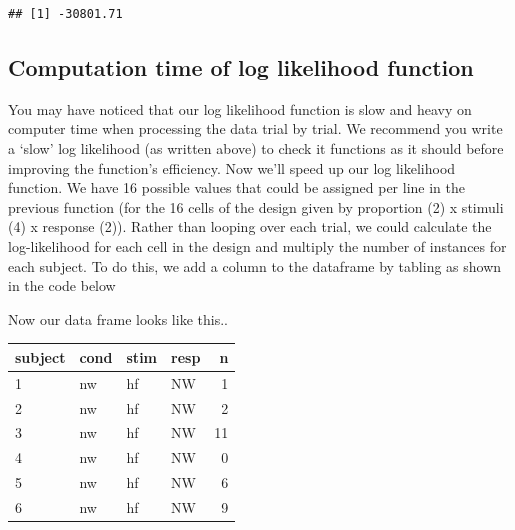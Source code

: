 \documentclass[]{book}
\newenvironment{Shaded}{\begin{snugshade}}{\end{snugshade}}
\newcommand{\KeywordTok}[1]{\textcolor[rgb]{0.13,0.29,0.53}{\textbf{#1}}}
\newcommand{\NormalTok}[1]{#1}
\newcommand{\OperatorTok}[1]{\textcolor[rgb]{0.81,0.36,0.00}{\textbf{#1}}}
\newcommand{\StringTok}[1]{\textcolor[rgb]{0.31,0.60,0.02}{#1}}
\begin{document}
\begin{verbatim}
## [1] -30801.71
\end{verbatim}

\hypertarget{computation-time-of-log-likelihood-function}{%
\subsection{Computation time of log likelihood function}\label{computation-time-of-log-likelihood-function}}

You may have noticed that our log likelihood function is slow and heavy on computer time when processing the data trial by trial. We recommend you write a `slow' log likelihood (as written above) to check it functions as it should before improving the function's efficiency.
Now we'll speed up our log likelihood function. We have 16 possible values that could be assigned per line in the previous function (for the 16 cells of the design given by proportion (2) x stimuli (4) x response (2)). Rather than looping over each trial, we could calculate the log-likelihood for each cell in the design and multiply the number of instances for each subject. To do this, we add a column to the dataframe by tabling as shown in the code below

\begin{Shaded}
\end{Shaded}

Now our data frame looks like this..

\begin{tabular}{l|l|l|l|r}
\hline
subject & cond & stim & resp & n\\
\hline
1 & nw & hf & NW & 1\\
\hline
2 & nw & hf & NW & 2\\
\hline
3 & nw & hf & NW & 11\\
\hline
4 & nw & hf & NW & 0\\
\hline
5 & nw & hf & NW & 6\\
\hline
6 & nw & hf & NW & 9\\
\hline
\end{tabular}
\end{document}
